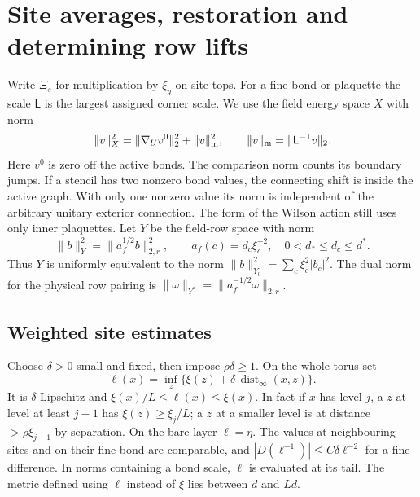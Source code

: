 \documentclass[11pt,letterpaper,reqno]{amsart}
\numberwithin{equation}{section}
\theoremstyle{definition}
\theoremstyle{remark}
\begin{document}
\section{Site averages, restoration and determining row lifts}
\label{mb:sec-rows-and-restoration}

Write \(\Xi_s\) for multiplication by \(\xi_y\) on site tops.
For a fine bond or plaquette the scale \(\mathsf L\) is the
largest assigned corner scale. We use the field energy space \(X\)
with norm
\begin{equation}\label{mb:eq-field-energy}
 \|v\|_X^2=\|\nabla_Uv^0\|_2^2+\|v\|_{\rm m}^2,
 \qquad \|v\|_{\rm m}=\|\mathsf L^{-1}v\|_2 .
\end{equation}
Here \(v^0\) is zero off the active bonds. The comparison norm
counts its boundary jumps. If a stencil has two nonzero bond
values, the connecting shift is inside the active graph. With
only one nonzero value its norm is independent of the arbitrary
unitary exterior connection. The form of the Wilson action
still uses only inner plaquettes. Let \(Y\) be the field-row
space with norm
\begin{equation}\label{mb:eq-row-energy}
 \|b\|_Y^2=\|a_f^{1/2}b\|_{2,r}^2,\qquad
               a_f(c)=d_c\xi_c^{-2},\quad 0<d_*\le d_c\le d^*.
\end{equation}
Thus \(Y\) is uniformly equivalent to the norm
\(\|b\|_{Y_0}^2=\sum_c \xi_c^2|b_c|^2\). The dual norm for
the physical row pairing is
\(\|\omega\|_{Y^*}=\|a_f^{-1/2}\omega\|_{2,r}\).

\subsection{Weighted site estimates}

Choose \(\delta>0\) small and fixed, then impose \(\rho\delta\ge1\).
On the whole torus set
\begin{equation}\label{mb:eq-slow-length}
 \ell(x)=\inf_z\{\xi(z)+\delta\,\operatorname{dist}_\infty(x,z)\}.
\end{equation}
It is \(\delta\)-Lipschitz and
\(\xi(x)/L\le \ell(x)\le\xi(x)\). In fact if \(x\) has level \(j\),
a \(z\) at level at least \(j-1\) has \(\xi(z)\ge\xi_j/L\);
a \(z\) at a smaller level is at distance \(>\rho\xi_{j-1}\)
by separation. On the bare layer \(\ell=\eta\). The values at
neighbouring sites and on their fine bond are comparable, and
\(|D(\ell^{-1})|\le C\delta\ell^{-2}\) for a fine difference.
In norms containing a bond scale, \(\ell\) is evaluated at its tail.
The metric defined using \(\ell\) instead of \(\xi\) lies between
\(d\) and \(Ld\).
\end{document}
